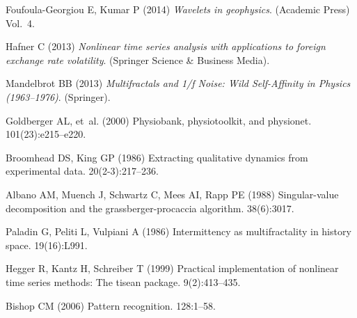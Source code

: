 \documentclass[9pt,twocolumn,twoside]{pnas-new}
\begin{document}
\begin{thebibliography}{10}
Foufoula-Georgiou E, Kumar P (2014) {\em Wavelets in geophysics}.
\newblock (Academic Press) Vol.{}~4.

Hafner C (2013) {\em Nonlinear time series analysis with applications to
  foreign exchange rate volatility}.
\newblock (Springer Science \& Business Media).

Mandelbrot BB (2013) {\em Multifractals and 1/ƒ Noise: Wild Self-Affinity in
  Physics (1963--1976)}.
\newblock (Springer).

Goldberger AL, et~al. (2000) Physiobank, physiotoolkit, and physionet.
 101(23):e215--e220.

Broomhead DS, King GP (1986) Extracting qualitative dynamics from experimental
  data.
 20(2-3):217--236.

Albano AM, Muench J, Schwartz C, Mees AI, Rapp PE (1988) Singular-value
  decomposition and the grassberger-procaccia algorithm.
 38(6):3017.

Paladin G, Peliti L, Vulpiani A (1986) Intermittency as multifractality in
  history space.
 19(16):L991.

Hegger R, Kantz H, Schreiber T (1999) Practical implementation of nonlinear
  time series methods: The tisean package.
  9(2):413--435.

Bishop CM (2006) Pattern recognition.
 128:1--58.

\end{thebibliography}
\end{document}
